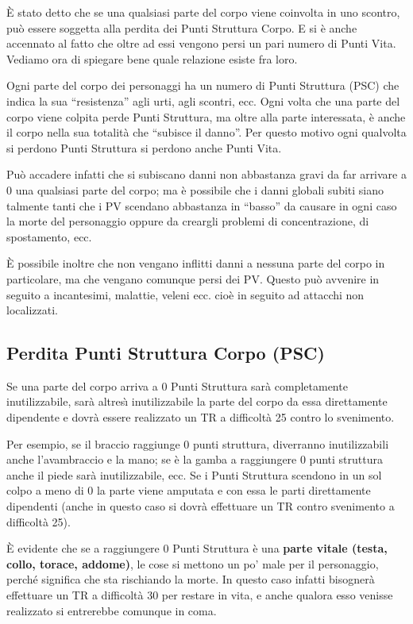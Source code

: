 \`E stato detto che se una qualsiasi parte del corpo viene coinvolta
in uno scontro, pu\`o essere soggetta alla perdita dei Punti Struttura
Corpo. E si \`e anche accennato al fatto che oltre ad essi vengono
persi un pari numero di Punti Vita.  Vediamo ora di spiegare bene
quale relazione esiste fra loro.

Ogni parte del corpo dei personaggi ha un numero di Punti Struttura
(PSC) che indica la sua ``resistenza'' agli urti, agli scontri, ecc.
Ogni volta che una parte del corpo viene colpita perde Punti
Struttura, ma oltre alla parte interessata, \`e anche il corpo nella
sua totalit\`a che ``subisce il danno''. Per questo motivo ogni
qualvolta si perdono Punti Struttura si perdono anche Punti Vita.

Pu\`o accadere infatti che si subiscano danni non abbastanza gravi da
far arrivare a 0 una qualsiasi parte del corpo; ma \`e possibile che i
danni globali subiti siano talmente tanti che i PV scendano abbastanza
in ``basso'' da causare in ogni caso la morte del personaggio oppure
da creargli problemi di concentrazione, di spostamento, ecc.

\`E possibile inoltre
che non vengano inflitti danni a nessuna parte del corpo in
particolare, ma che vengano comunque persi dei PV. Questo pu\`o
avvenire in seguito a incantesimi, malattie, veleni ecc. cio\`e in
seguito ad attacchi non localizzati.

{\raggedright \subsection{Perdita Punti Struttura Corpo (PSC)}}
\label{perditapsc}
Se una parte del corpo arriva a 0 Punti Struttura sar\`a
completamente inutilizzabile, sar\`a altres\`{\i} inutilizzabile la
parte del corpo da essa direttamente dipendente e dovr\`a essere
realizzato un TR a difficolt\`a 25 contro lo svenimento. 

Per esempio, se il braccio raggiunge 0 punti struttura, diverranno
inutilizzabili anche l'avambraccio e la mano; se \`e la gamba a
raggiungere 0 punti struttura anche il piede sar\`a inutilizzabile,
ecc. Se i Punti Struttura scendono in un sol colpo a meno di 0 la
parte viene amputata e con essa le parti direttamente dipendenti
(anche in questo caso si dovr\`a effettuare un TR contro svenimento
a difficolt\`a 25).

\`E evidente che se a raggiungere 0 Punti Struttura \`e una
\textbf{parte vitale (testa, collo, torace, addome)}, le cose si
mettono un po' male per il personaggio, perch\'e significa che sta
rischiando la morte. In questo caso infatti bisogner\`a effettuare un
TR a difficolt\`a 30 per restare in vita, e anche qualora esso venisse
realizzato si entrerebbe comunque in coma.

